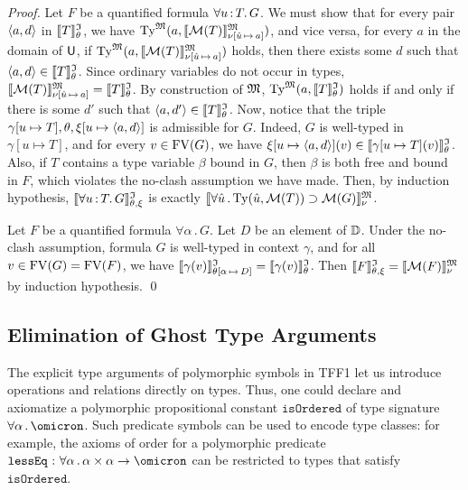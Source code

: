 \begin{proof}
Let $F$ be a quantified formula $\forall u \operatorname{:} T .\, G$.
We must show that for every pair $\langle a,d \rangle$ in $\llbracket T\rrbracket^{\mathfrak{I}}_{\theta}$, we have
$\mathrm{Ty}^{\mathfrak{M}}(a, \llbracket \mathcal{M}(T) \rrbracket^{\mathfrak{M}}_{\nu[\hat{u}\,\mapsto\,a]})$,
and vice versa, for every $a$ in the domain of $\mathsf{U}$, if
$\mathrm{Ty}^{\mathfrak{M}}(a, \llbracket \mathcal{M}(T) \rrbracket^{\mathfrak{M}}_{\nu[\hat{u}\,\mapsto\,a]})$
holds, then there exists some $d$ such that $\langle a,d \rangle \in
\llbracket T\rrbracket^{\mathfrak{I}}_{\theta}$.
%
Since ordinary variables do not occur in types,
$\llbracket \mathcal{M}(T) \rrbracket^{\mathfrak{M}}_{\nu[\hat{u}\,\mapsto\,a]} =
\llbracket T \rrbracket^{\mathfrak{I}}_\theta$.
By construction of $\mathfrak{M}$,
$\mathrm{Ty}^{\mathfrak{M}}(a, \llbracket T \rrbracket^{\mathfrak{I}}_\theta)$
holds if and only if there is some $d'$ such that
$\langle a,d' \rangle \in \llbracket T \rrbracket^{\mathfrak{I}}_\theta$.
%
Now, notice that the triple $\gamma[u \mapsto T],
\theta,\xi[u \mapsto \langle a,d \rangle]$ is admissible for $G$.
Indeed, $G$ is well-typed in $\gamma[u \mapsto T]$,
and for every $v \in \mathrm{FV}(G)$, we have
$\xi[u \mapsto \langle a,d \rangle](v) \in \llbracket\gamma[u \mapsto T](v)\rrbracket^{\mathfrak{I}}_{\theta}$.
Also, if $T$ contains a type variable $\beta$ bound in $G$,
then $\beta$ is both free and bound in $F$, which violates
the no-clash assumption we have made.
%
Then, by induction hypothesis, $\llbracket\forall u \operatorname{:} T .\, G\rrbracket^{\mathfrak{I}}_{\theta,\xi}$
is exactly $\llbracket \forall \hat{u} \,.\, \mathrm{Ty}(\hat{u},\mathcal{M}(T))
\supset \mathcal{M}(G) \rrbracket^{\mathfrak{M}}_{\nu}$.

Let $F$ be a quantified formula $\forall \alpha \,.\, G$.
Let $D$ be an element of $\mathbb{D}$. Under the no-clash assumption,
formula $G$ is well-typed in context $\gamma$, and for all
$v \in \mathrm{FV}(G) = \mathrm{FV}(F)$, we have
$\llbracket\gamma(v)\rrbracket^{\mathfrak{I}}_{\theta[\alpha\,\mapsto\,D]} = \llbracket\gamma(v)\rrbracket^{\mathfrak{I}}_{\theta}$.
Then $\llbracket F\rrbracket^{\mathfrak{I}}_{\theta,\xi} = \llbracket \mathcal{M}(F) \rrbracket^{\mathfrak{M}}_{\nu}$ by induction hypothesis.
\qed
\end{proof}

\subsection{Elimination of Ghost Type Arguments} \label{ssec:ghost}
The explicit type arguments of polymorphic symbols
in TFF1 let us introduce operations and relations directly on types.
Thus, one could declare and axiomatize a polymorphic propositional
constant $\mathtt{isOrdered}$ of type signature $\forall\alpha\,.\,\omicron$.
Such predicate symbols can be used to encode type classes:
for example, the axioms of order for a polymorphic predicate
$\mathtt{lessEq} \,\ty\, \forall\alpha\,.\,\alpha\times\alpha\to\omicron$
can be restricted to types that satisfy $\mathtt{isOrdered}$.

